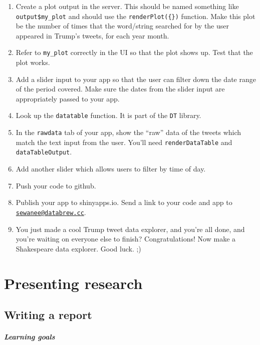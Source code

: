 \documentclass[
]{book}
\begin{document}
\begin{enumerate}
\def\labelenumi{\arabic{enumi}.}
\setcounter{enumi}{9}
\item
  Create a plot output in the server. This should be named something like \texttt{output\$my\_plot} and should use the \texttt{renderPlot(\{\})} function. Make this plot be the number of times that the word/string searched for by the user appeared in Trump's tweets, for each year month.
\item
  Refer to \texttt{my\_plot} correctly in the UI so that the plot shows up. Test that the plot works.
\item
  Add a slider input to your app so that the user can filter down the date range of the period covered. Make sure the dates from the slider input are appropriately passed to your app.
\item
  Look up the \texttt{datatable} function. It is part of the \texttt{DT} library.
\item
  In the \texttt{rawdata} tab of your app, show the ``raw'' data of the tweets which match the text input from the user. You'll need \texttt{renderDataTable} and \texttt{dataTableOutput}.
\item
  Add another slider which allows users to filter by time of day.
\item
  Push your code to github.
\item
  Publish your app to shinyapps.io. Send a link to your code and app to \href{mailto:sewanee@databrew.cc}{\nolinkurl{sewanee@databrew.cc}}.
\item
  You just made a cool Trump tweet data explorer, and you're all done, and you're waiting on everyone else to finish? Congratulations! Now make a Shakespeare data explorer. Good luck. ;)
\end{enumerate}

\hypertarget{part-presenting-research}{%
\part{Presenting research}\label{part-presenting-research}}

\hypertarget{writing-a-report}{%
\chapter{Writing a report}\label{writing-a-report}}

\hypertarget{learning-goals-17}{%
\subsubsection*{Learning goals}\label{learning-goals-17}}
\end{document}
